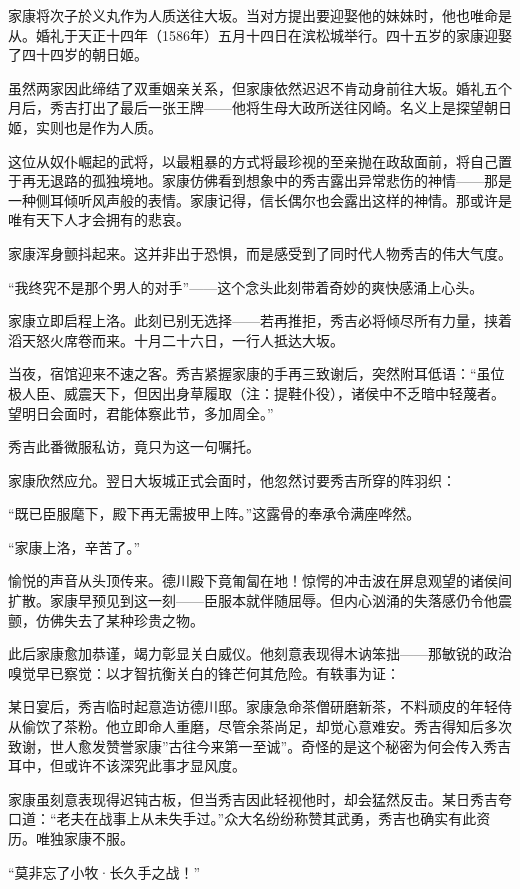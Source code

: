 \documentclass[
]{book}
\begin{document}
家康将次子於义丸作为人质送往大坂。当对方提出要迎娶他的妹妹时，他也唯命是从。婚礼于天正十四年（1586年）五月十四日在滨松城举行。四十五岁的家康迎娶了四十四岁的朝日姬。

虽然两家因此缔结了双重姻亲关系，但家康依然迟迟不肯动身前往大坂。婚礼五个月后，秀吉打出了最后一张王牌------他将生母大政所送往冈崎。名义上是探望朝日姬，实则也是作为人质。

这位从奴仆崛起的武将，以最粗暴的方式将最珍视的至亲抛在政敌面前，将自己置于再无退路的孤独境地。家康仿佛看到想象中的秀吉露出异常悲伤的神情------那是一种侧耳倾听风声般的表情。家康记得，信长偶尔也会露出这样的神情。那或许是唯有天下人才会拥有的悲哀。

家康浑身颤抖起来。这并非出于恐惧，而是感受到了同时代人物秀吉的伟大气度。

``我终究不是那个男人的对手''------这个念头此刻带着奇妙的爽快感涌上心头。

家康立即启程上洛。此刻已别无选择------若再推拒，秀吉必将倾尽所有力量，挟着滔天怒火席卷而来。十月二十六日，一行人抵达大坂。

当夜，宿馆迎来不速之客。秀吉紧握家康的手再三致谢后，突然附耳低语：``虽位极人臣、威震天下，但因出身草履取（注：提鞋仆役），诸侯中不乏暗中轻蔑者。望明日会面时，君能体察此节，多加周全。''

秀吉此番微服私访，竟只为这一句嘱托。

家康欣然应允。翌日大坂城正式会面时，他忽然讨要秀吉所穿的阵羽织：

``既已臣服麾下，殿下再无需披甲上阵。''这露骨的奉承令满座哗然。

``家康上洛，辛苦了。''

愉悦的声音从头顶传来。德川殿下竟匍匐在地！惊愕的冲击波在屏息观望的诸侯间扩散。家康早预见到这一刻------臣服本就伴随屈辱。但内心汹涌的失落感仍令他震颤，仿佛失去了某种珍贵之物。

此后家康愈加恭谨，竭力彰显关白威仪。他刻意表现得木讷笨拙------那敏锐的政治嗅觉早已察觉：以才智抗衡关白的锋芒何其危险。有轶事为证：

某日宴后，秀吉临时起意造访德川邸。家康急命茶僧研磨新茶，不料顽皮的年轻侍从偷饮了茶粉。他立即命人重磨，尽管余茶尚足，却觉心意难安。秀吉得知后多次致谢，世人愈发赞誉家康''古往今来第一至诚''。奇怪的是这个秘密为何会传入秀吉耳中，但或许不该深究此事才显风度。

家康虽刻意表现得迟钝古板，但当秀吉因此轻视他时，却会猛然反击。某日秀吉夸口道：``老夫在战事上从未失手过。''众大名纷纷称赞其武勇，秀吉也确实有此资历。唯独家康不服。

``莫非忘了小牧·长久手之战！''
\end{document}
